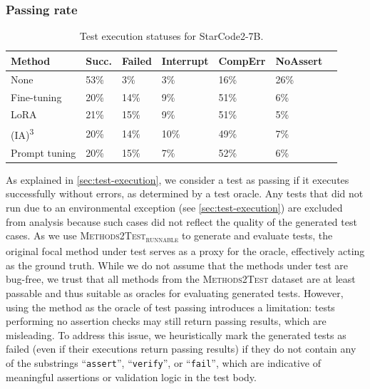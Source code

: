 \documentclass[12pt]{book}
\begin{document}
\subsubsection{Passing rate}
\begin{table}[htb]
    \centering
    \caption{Test execution statuses for StarCode2-7B.}
    \label{tab:test-statuses}
    \small
    \begin{tabularx}{\columnwidth}{lYYYYYY}
    \toprule
    \textbf{Method} & \textbf{Succ.} & \textbf{Failed} & \textbf{Interrupt} & \textbf{CompErr} & \textbf{NoAssert} \\
    \midrule
    None & 53\% & 3\% & 3\% & 16\% & 26\% \\
    Fine-tuning & 20\% & 14\% & 9\% & 51\% & 6\% \\
    LoRA & 21\% & 15\% & 9\% & 51\% & 5\% \\
    (IA)\textsuperscript{3} & 20\% & 14\% & 10\% & 49\% & 7\% \\
    Prompt tuning & 20\% & 15\% & 7\% & 52\% & 6\% \\
    \bottomrule
    \end{tabularx}
\end{table}
As explained in \cref{sec:test-execution}, we consider a test as passing if it executes successfully without errors, as determined by a test oracle. 
Any tests that did not run due to an environmental exception (see \cref{sec:test-execution}) are excluded from analysis because such cases did not reflect the quality of the generated test cases. 
As we use \textsc{Methods2Test\textsubscript{runnable}} to generate and evaluate tests, the original focal method under test serves as a proxy for the oracle, effectively acting as the ground truth. While we do not assume that the methods under test are bug-free, we trust that all methods from the \textsc{Methods2Test} dataset are at least passable and thus suitable as oracles for evaluating generated tests. However, using the method as the oracle of test passing introduces a limitation: tests performing no assertion checks may still return passing results, which are misleading. To address this issue, we heuristically mark the generated tests as failed (even if their executions return passing results) if they do not contain any of the substrings ``\texttt{assert}'', ``\texttt{verify}'', or ``\texttt{fail}'', which are indicative of meaningful assertions or validation logic in the test body.
\end{document}
